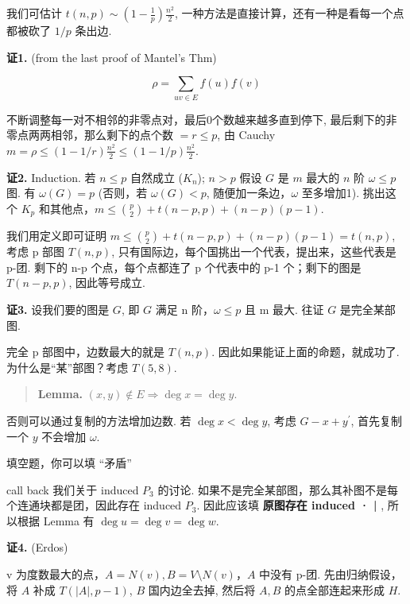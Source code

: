 
我们可估计 $t(n,p)\sim (1-\frac{1}{p})\frac{n^2}{2}$, 一种方法是直接计算，还有一种是看每一个点都被砍了 $1/p$ 条出边.

\textbf{证1.} (from the last proof of Mantel's Thm)

\[
\rho=\sum_{uv\in E}f(u)f(v)
\]

不断调整每一对不相邻的非零点对，最后0个数越来越多直到停下, 最后剩下的非零点两两相邻，那么剩下的点个数 $=r\leq p$, 由 Cauchy $m=\rho\leq(1-1/r)\frac{n^2}{2}\leq(1-1/p)\frac{n^2}{2}$.

\textbf{证2.} Induction. 若 $n\leq p$ 自然成立 ($K_n$); $n>p$ 假设 $G$ 是 $m$ 最大的 $n$ 阶 $\omega\leq p$ 图. 有 $\omega(G)=p$ (否则，若 $\omega(G)<p$, 随便加一条边，$\omega$ 至多增加1). 挑出这个 $K_p$ 和其他点，$m\leq{p\choose2}+t(n-p,p)+(n-p)(p-1)$.


我们用定义即可证明 $m\leq{p\choose2}+t(n-p,p)+(n-p)(p-1)=t(n,p)$, 考虑 p 部图 $T(n,p)$, 只有国际边，每个国挑出一个代表，提出来，这些代表是 p-团. 剩下的 n-p 个点，每个点都连了 p 个代表中的 p-1 个；剩下的图是 $T(n-p,p)$, 因此等号成立.

\textbf{证3.} 设我们要的图是 $G$, 即 $G$ 满足 n 阶，$\omega\leq p$ 且 m 最大. 往证 $G$ 是完全某部图.

完全 p 部图中，边数最大的就是 $T(n,p)$. 因此如果能证上面的命题，就成功了. 为什么是“某”部图？考虑 $T(5,8)$.

\begin{quotation}
\textbf{Lemma.} $(x,y)\notin E\Rightarrow \deg x=\deg y$.
\end{quotation}

否则可以通过复制的方法增加边数. 若 $\deg x<\deg y$, 考虑 $G-x+y^\prime$, 首先复制一个 $y$ 不会增加 $\omega$.

填空题，你可以填 “矛盾” 🤣🤣


call back 我们关于 induced $P_3$ 的讨论. 如果不是完全某部图，那么其补图不是每个连通块都是团，因此存在 induced $P_3$. 因此应该填 \textbf{原图存在 induced · |} , 所以根据 Lemma 有 $\deg u=\deg v=\deg w$.


\textbf{证4.} (Erdos)

v 为度数最大的点，$A=N(v),B=V\setminus N(v)$，$A$ 中没有 p-团. 先由归纳假设，将 $A$ 补成 $T(|A|,p-1)$, $B$ 国内边全去掉, 然后将 $A,B$ 的点全部连起来形成 $H$.

